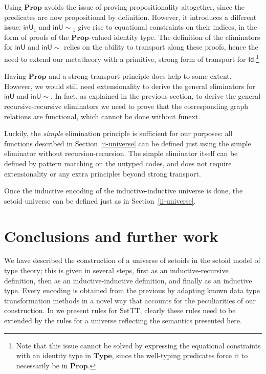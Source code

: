 \documentclass[autoref]{llncs}
\newcommand{\inU}{\mathsf{inU}}
\newcommand{\inUU}{\mathsf{inU{\sim}}}
\newcommand{\mType}{\mathbf{Type}}
\newcommand{\mProp}{\mathbf{Prop}}
\begin{document}
Using $\mProp$ avoids the issue of proving propositionality altogether, since the
predicates are now propositional by definition.
%
However, it introduces a different issue: $\inU_1$ and $\inUU_1$ give
rise to equational constraints on their indices, in the form of proofs of the
$\mProp$-valued identity type. The definition of the eliminators for $\inU$
and $\inUU$ relies on the ability to transport along these proofs, hence
the need to extend our metatheory with a primitive, strong form of transport for
$\textsf{Id}$.\footnote{Note that this issue cannot be solved by expressing the
  equational constraints with an identity type in $\mType$, since the
  well-typing predicates force it to necessarily be in $\mProp$.}

Having $\mProp$ and a strong transport principle does help to some extent.
%
However, we would still need extensionality to derive the general eliminators
for $\inU$ and $\inUU$. In fact, as explained in the previous section,
to derive the general recursive-recursive eliminators we need to prove that the
corresponding graph relations are functional, which cannot be done without funext.

Luckily, the \emph{simple} elimination principle is sufficient for our
purposes: all functions described in Section \ref{ii-universe} can be
defined just using the simple eliminator without
recursion-recursion. The simple eliminator itself can be defined by
pattern matching on the untyped codes, and does not require
extensionality or any extra principles beyond strong transport. 

Once the inductive encoding of the inductive-inductive universe is done, the
setoid universe can be defined just as in Section~\ref{ii-universe}.

\section{Conclusions and further work}\label{further-work}

We have described the construction of a universe of setoids in the setoid model
of type theory; this is given in several steps, first as an inductive-recursive
definition, then as an inductive-inductive definition, and finally as an
inductive type. Every encoding is obtained from the previous by adapting known
data type transformation methods in a novel way that accounts for the
peculiarities of our construction. In \cite{mpc19} we present rules
for SetTT, clearly these rules need to be extended by the rules for a
universe reflecting the semantics presented here.
%
\end{document}
